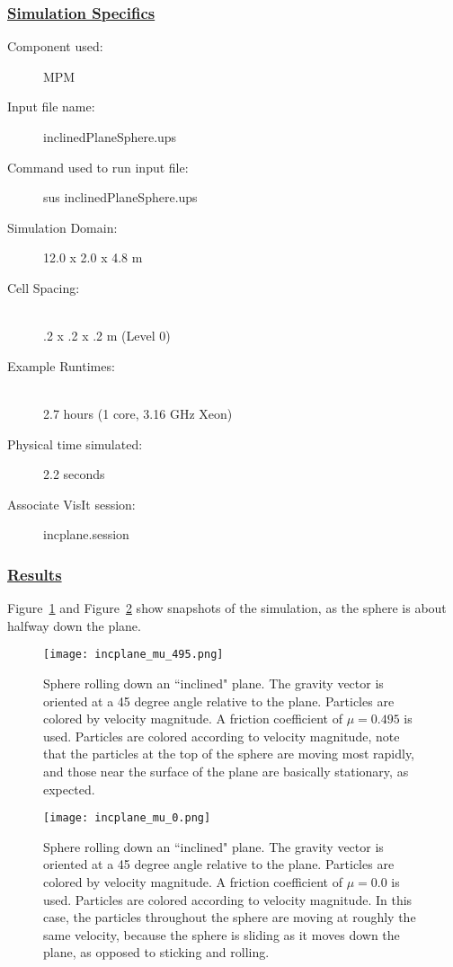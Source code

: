 \subsubsection*{\underline{Simulation Specifics}}
\begin{description} 
\item [Component used:] \hfill MPM
\item [Input file name:] \hfill inclinedPlaneSphere.ups
\item [Command used to run input file:]\hfill sus inclinedPlaneSphere.ups
\item [Simulation Domain:]\hfill    12.0 x 2.0 x 4.8 m

\item [Cell Spacing:]\hfill \\ 
.2 x .2 x .2 m (Level 0)

\item [Example Runtimes:] \hfill \\
 2.7 hours  (1 core, 3.16 GHz Xeon)\\

\item [Physical time simulated:] \hfill 2.2 seconds

\item [Associate VisIt session:] \hfill incplane.session

\end{description}

\subsubsection*{\underline{Results}}
Figure~\ref{figincplaneSphere_bigmu} and Figure~\ref{figincplaneSphere_0mu}
show snapshots of the simulation, as
the sphere is about halfway down the plane.
\begin{figure}
  \center
  \vspace{-35pt}
  \texttt{[image: incplane\_mu\_495.png]}
  \caption{Sphere rolling down an ``inclined" plane.  The gravity vector
is oriented at a 45 degree angle relative to the plane.  Particles are colored
by velocity magnitude. A friction coefficient of $\mu = 0.495$ is used.
Particles are colored according
to velocity magnitude, note that the particles at the top of the sphere
are moving most rapidly, and those near the surface of the plane are 
basically stationary, as expected.}
  \label{figincplaneSphere_bigmu}
\end{figure}

\begin{figure}
  \center
  \vspace{-15pt}
  \texttt{[image: incplane\_mu\_0.png]}
  \caption{Sphere rolling down an ``inclined" plane.  The gravity vector
is oriented at a 45 degree angle relative to the plane.  Particles are colored
by velocity magnitude.  A friction coefficient of $\mu = 0.0$ is used.
Particles are colored according to velocity magnitude.  In this case,
the particles throughout the sphere are moving at roughly the same velocity,
because the sphere is sliding as it moves down the plane, as opposed to
sticking and rolling.}
  \label{figincplaneSphere_0mu}
\end{figure}

